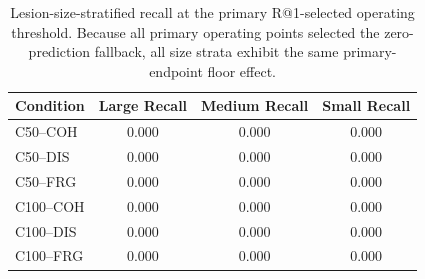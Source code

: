 \begin{table}[t]
\centering
\small
\caption{Lesion-size-stratified recall at the primary R@1-selected operating threshold. Because all primary operating points selected the zero-prediction fallback, all size strata exhibit the same primary-endpoint floor effect.}
\label{tab:cova_lesion_size_floor}
\begin{tabular}{lccc}
\toprule
Condition & Large Recall & Medium Recall & Small Recall \\
\midrule
C50–COH & 0.000 & 0.000 & 0.000 \\
C50–DIS & 0.000 & 0.000 & 0.000 \\
C50–FRG & 0.000 & 0.000 & 0.000 \\
C100–COH & 0.000 & 0.000 & 0.000 \\
C100–DIS & 0.000 & 0.000 & 0.000 \\
C100–FRG & 0.000 & 0.000 & 0.000 \\
\bottomrule
\end{tabular}
\end{table}
